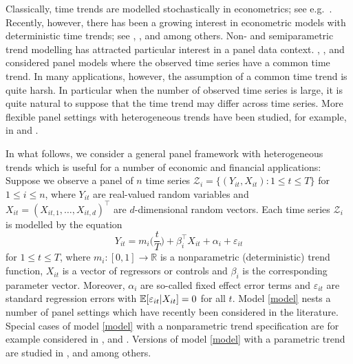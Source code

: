 \documentclass[a4paper,12pt]{article}
\begin{document}
Classically, time trends are modelled stochastically in econometrics; see e.g.\ \cite{Stock1988}. Recently, however, there has been a growing interest in econometric models with deterministic time trends; see \cite{Cai2007}, \cite{Atak2011}, \cite{Robinson2012} and \cite{ChenGaoLi2012} among others. Non- and semiparametric trend modelling has attracted particular interest in a panel data context. \cite{LiChenGao2010}, \cite{Atak2011}, \cite{Robinson2012} and \cite{ChenGaoLi2012} considered panel models where the observed time series have a common time trend. In many applications, however, the assumption of a common time trend is quite harsh. In particular when the number of observed time series is large, it is quite natural to suppose that the time trend may differ across time series. More flexible panel settings with heterogeneous trends have been studied, for example, in \cite{Zhang2012} and \cite{Hidalgo2014}. 


In what follows, we consider a general panel framework with heterogeneous trends which is useful for a number of economic and financial applications: 
Suppose we observe a panel of $n$ time series $\mathcal{Z}_i = \{ (Y_{it},X_{it}): 1 \le t \le T \}$ for $1 \le i \le n$, where $Y_{it}$ are real-valued random variables and $X_{it} = (X_{it,1},\ldots,X_{it,d})^\top$ are $d$-dimensional random vectors. Each time series $\mathcal{Z}_i$ is modelled by the equation
\begin{equation}\label{model}
Y_{it} = m_i \Big( \frac{t}{T} \Big) + \beta_i^\top X_{it} + \alpha_i + \varepsilon_{it}
\end{equation}
for $1 \le t \le T$, where $m_i: [0,1] \rightarrow \mathbb{R}$ is a nonparametric (deterministic) trend function, $X_{it}$ is a vector of regressors or controls and $\beta_i$ is the corresponding parameter vector. Moreover, $\alpha_i$ are so-called fixed effect error terms and $\varepsilon_{it}$ are standard regression errors with $\mathbb{E}[\varepsilon_{it}|X_{it}] = 0$ for all $t$. Model \eqref{model} nests a number of panel settings which have recently been considered in the literature. Special cases of model \eqref{model} with a nonparametric trend specification are for example considered in \cite{Atak2011}, \cite{Zhang2012} and \cite{Hidalgo2014}. Versions of model \eqref{model} with a parametric trend are studied in \cite{Vogelsang2005}, \cite{Sun2011} and \cite{Xu2012} among others.
\end{document}
